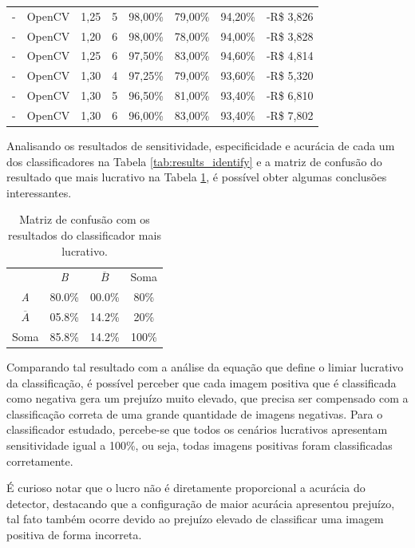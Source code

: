 \begin{table}[htbp]
\begin{tabular}{clrrrrrr}
        -     & OpenCV & 1,25 & 5  & 98,00\%       & 79,00\%        & 94,20\%  & -R\$ 3,826 \\
        -     & OpenCV & 1,20 & 6  & 98,00\%       & 78,00\%        & 94,00\%  & -R\$ 3,828 \\
        -     & OpenCV & 1,25 & 6  & 97,50\%       & 83,00\%        & 94,60\%  & -R\$ 4,814 \\
        -     & OpenCV & 1,30 & 4  & 97,25\%       & 79,00\%        & 93,60\%  & -R\$ 5,320 \\
        -     & OpenCV & 1,30 & 5  & 96,50\%       & 81,00\%        & 93,40\%  & -R\$ 6,810 \\
        -     & OpenCV & 1,30 & 6  & 96,00\%       & 83,00\%        & 93,40\%  & -R\$ 7,802 \\
    \end{tabular}
\end{table}

Analisando os resultados de sensitividade, especificidade e acurácia de cada um dos classificadores na Tabela \ref{tab:results_identify} e a matriz de confusão do resultado que mais lucrativo na Tabela \ref{tab:matriz_de_confusao_best_result}, é possível obter algumas conclusões interessantes.

\begin{table}[htbp]
    \caption{Matriz de confusão com os resultados do classificador mais lucrativo.}
    \label{tab:matriz_de_confusao_best_result}
    \centering
    \begin{tabular}{cccc}\hline\hline
                       & \textit{B} & $\overline{B}$ & Soma  \\
        \textit{A}     & 80.0\%     & 00.0\%         & 80\%  \\
        $\overline{A}$ & 05.8\%     & 14.2\%         & 20\%  \\
        Soma           & 85.8\%     & 14.2\%         & 100\% \\
        \hline\hline
    \end{tabular}
\end{table}

Comparando tal resultado com a análise da equação que define o limiar lucrativo da classificação, é possível perceber que cada imagem positiva que é classificada como negativa gera um prejuízo muito elevado, que precisa ser compensado com a classificação correta de uma grande quantidade de imagens negativas. Para o classificador estudado, percebe-se que todos os cenários lucrativos apresentam sensitividade igual a 100\%, ou seja, todas imagens positivas foram classificadas corretamente.

É curioso notar que o lucro não é diretamente proporcional a acurácia do detector, destacando que a configuração de maior acurácia apresentou prejuízo, tal fato também ocorre devido ao prejuízo elevado de classificar uma imagem positiva de forma incorreta.